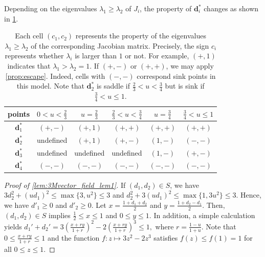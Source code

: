 \documentclass[letterpaper,11pt]{article}
\begin{document}
Depending on the eigenvalues $\lambda_1\geq \lambda_2$ of $J_i$, the property of $\mathbf{d}^*_i$ changes as shown in \cref{tbl:eigentable}.
\begin{table}[htbp]
\caption{
Each cell $(c_1,c_2)$ represents the property of the eigenvalues $\lambda_1\geq\lambda_2$ of the corresponding Jacobian matrix.
Precisely, the sign $c_i$ represents whether $\lambda_i$ is larger than $1$ or not.
For example, $(+,1)$ indicates that $\lambda_1>\lambda_2=1$.
If $(+,-)$ or $(+,+)$, we may apply \cref{prop:escape}.
Indeed, cells with $(-,-)$ correspond sink points in this model.
Note that $\mathbf{d}^*_2$ is saddle if $\frac{2}{3}<u<\frac{3}{4}$ but is sink if $\frac{3}{4}<u\leq 1$.
\label{tbl:eigentable}}
\vspace{1em}
\centering
\begin{tabular}{|c|c|c|c|c|c|}
\hline
points           & $0<u<\frac{2}{3}$ & $u=\frac{2}{3}$ & $\frac{2}{3}<u<\frac{3}{4}$ & $u=\frac{3}{4}$ & $\frac{3}{4}<u\leq 1$ \\ \hline
$\mathbf{d}^*_1$ & $(+,-)$           & $(+,1)$         & $(+,+)$                     & $(+,+)$         & $(+,+)$               \\ \hline
$\mathbf{d}^*_2$ &  undefined  & $(+,1)$         & $(+,-)$                     & $(1,-)$         & $(-,-)$               \\ \hline
$\mathbf{d}^*_3$ &  undefined       &  undefined      &    undefined               & $(1,-)$         & $(+,-)$               \\ \hline
$\mathbf{d}^*_4$ & $(-,-)$           & $(-,-)$         & $(-,-)$                     & $(-,-)$         & $(-,-)$               \\ \hline
\end{tabular}
\end{table}

\begin{proof}[Proof of \cref{lem:3Mvector_field_lem1}]
If $(d_1,d_2)\in S$, we have $3d_2^2+(ud_1)^2\leq\max\{3,u^2\}\leq 3$ and $d_2^2+3(ud_1)^2\leq\max\{1,3u^2\}\leq 3$.
Hence, we have $d'_1\geq 0$ and $d'_2\geq 0$.
Let $x=\frac{1+d_1+d_2}{2}$ and $y=\frac{1+d_2-d_1}{2}$.
Then, $(d_1,d_2)\in S$ implies $\frac{1}{2}\leq x \leq 1$ and $0\leq y\leq 1$.
In addition, a simple calculation yields
$
d_1'+d_2'=3\left(\frac{x+ry}{1+r}\right)^2-2\left(\frac{x+ry}{1+r}\right)^3 \leq 1,
$
where $r=\frac{1-u}{1+u}$.
Note that $0\leq\frac{x+ry}{1+r}\leq 1$ and the function $f:z\mapsto 3z^2-2z^3$ satisfies $f(z)\leq f(1)=1$ for all $0\leq z\leq 1$.
\end{proof}
\end{document}
